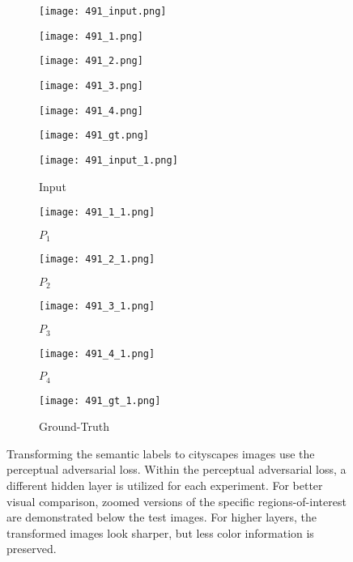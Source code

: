 \documentclass{article}
\begin{document}
\begin{figure*}[!t]
\captionsetup[subfigure]{labelformat=empty}
\centering
 \begin{subfigure}[b]{0.16\textwidth}
    \texttt{[image: 491\_input.png]}%
    \label{fig_first_case}
 \end{subfigure}
 \begin{subfigure}[b]{0.16\textwidth}
    \texttt{[image: 491\_1.png]}%
    \label{fig_first_case}
 \end{subfigure}
 \begin{subfigure}[b]{0.16\textwidth}
    \texttt{[image: 491\_2.png]}%
    \label{fig_first_case}
 \end{subfigure}
 \begin{subfigure}[b]{0.16\textwidth}
    \texttt{[image: 491\_3.png]}%
    \label{fig_first_case}
 \end{subfigure}
 \begin{subfigure}[b]{0.16\textwidth}
    \texttt{[image: 491\_4.png]}%
    \label{fig_first_case}
 \end{subfigure}
 \begin{subfigure}[b]{0.16\textwidth}
    \texttt{[image: 491\_gt.png]}%
    \label{fig_first_case}
 \end{subfigure}
 \begin{subfigure}[b]{0.16\textwidth}
    \texttt{[image: 491\_input\_1.png]}
    \caption{Input}
    \label{fig_first_case}
 \end{subfigure}
 \begin{subfigure}[b]{0.16\textwidth}
    \texttt{[image: 491\_1\_1.png]}
    \caption{$P_1$}
    \label{fig_first_case}
 \end{subfigure}
 \begin{subfigure}[b]{0.16\textwidth}
    \texttt{[image: 491\_2\_1.png]}
    \caption{$P_2$}
    \label{fig_first_case}
 \end{subfigure}
 \begin{subfigure}[b]{0.16\textwidth}
    \texttt{[image: 491\_3\_1.png]}
    \caption{$P_3$}
    \label{fig_first_case}
 \end{subfigure}
 \begin{subfigure}[b]{0.16\textwidth}
    \texttt{[image: 491\_4\_1.png]}
    \caption{$P_4$}
    \label{fig_first_case}
 \end{subfigure}
 \begin{subfigure}[b]{0.16\textwidth}
    \texttt{[image: 491\_gt\_1.png]}
    \caption{Ground-Truth}
    \label{fig_first_case}
 \end{subfigure}
\caption{Transforming the semantic labels to cityscapes images use the perceptual adversarial loss. Within the perceptual adversarial loss, a different hidden layer is utilized for each experiment. For better visual comparison, zoomed versions of the specific regions-of-interest are demonstrated below the test images. For higher layers, the transformed images look sharper, but less color information is preserved.}
\label{fig:analysis}
\end{figure*}
\end{document}

